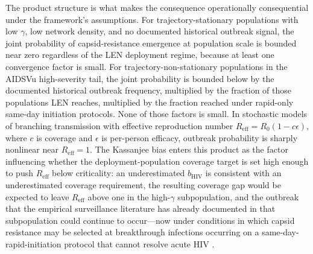\documentclass[12pt]{article}
\begin{document}
The product structure is what makes the consequence operationally consequential under the framework's assumptions. For trajectory-stationary populations with low $\gamma$, low network density, and no documented historical outbreak signal, the joint probability of capsid-resistance emergence at population scale is bounded near zero regardless of the LEN deployment regime, because at least one convergence factor is small. For trajectory-non-stationary populations in the AIDSVu high-severity tail, the joint probability is bounded below by the documented historical outbreak frequency, multiplied by the fraction of those populations LEN reaches, multiplied by the fraction reached under rapid-only same-day initiation protocols. None of those factors is small. In stochastic models of branching transmission with effective reproduction number $R_{\mathrm{eff}} = R_0(1 - c\epsilon)$, where $c$ is coverage and $\epsilon$ is per-person efficacy, outbreak probability is sharply nonlinear near $R_{\mathrm{eff}} = 1$. The Kassanjee bias enters this product as the factor influencing whether the deployment-population coverage target is set high enough to push $R_{\mathrm{eff}}$ below criticality: an underestimated $b_{\mathrm{HIV}}$ is consistent with an underestimated coverage requirement, the resulting coverage gap would be expected to leave $R_{\mathrm{eff}}$ above one in the high-$\gamma$ subpopulation, and the outbreak that the empirical surveillance literature has already documented in that subpopulation could continue to occur---now under conditions in which capsid resistance may be selected at breakthrough infections occurring on a same-day-rapid-initiation protocol that cannot resolve acute HIV \cite{wirden2024,who2025}.
\end{document}

